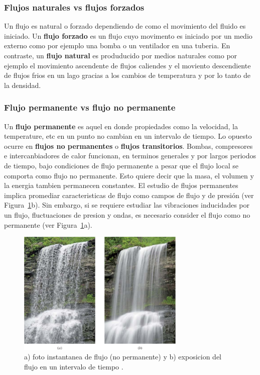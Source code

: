 \documentclass[10pt, oneside]{article}
\begin{document}
\subsubsection{Flujos naturales vs flujos forzados}
Un flujo es natural o forzado dependiendo de como el movimiento del fluido es iniciado. Un \textbf{flujo forzado} es un  flujo cuyo movimento es iniciado por un medio externo como por ejemplo una bomba o un ventilador en una tuberia. En contraste, un \textbf{flujo natural} es produducido por medios naturales como por ejemplo el movimiento ascendente de flujos caliendes y el moviento descendiente de flujos frios en un lago gracias a los cambios de temperatura y por lo tanto de la densidad. 

\subsubsection{Flujo permanente vs flujo no permanente}
Un \textbf{flujo permanente} es aquel en donde propiedades como la velocidad, la temperature, etc en un punto no cambian en un intervalo de tiempo. Lo opuesto ocurre en \textbf{flujos no permanentes} o \textbf{flujos transitorios}. Bombas, compresores e intercanbiadores de calor funcionan, en terminos generales y por largos periodos de tiempo, bajo condiciones de flujo permanente a pesar que el flujo local se comporta como flujo no permanente. Esto quiere decir que la masa, el volumen y la energia tambien permanecen constantes. El estudio de flujos permanentes implica promediar caracteristicas de flujo como campos de flujo y de presi\'on (ver Figura~\ref{steNos}b). Sin embargo, si se requiere estudiar las vibraciones inducidades por un flujo, fluctuaciones de presion y ondas, es necesario consider el flujo como no permanente (ver Figura~\ref{steNos}a). 

\begin{figure}[h]
\centering
\includegraphics[width=8cm]{steNos}
\caption{a) foto instantanea de flujo (no permanente) y b) exposicion del flujo en un intervalo de tiempo \cite{this}.}
\label{steNos}
\end{figure}
\end{document}
